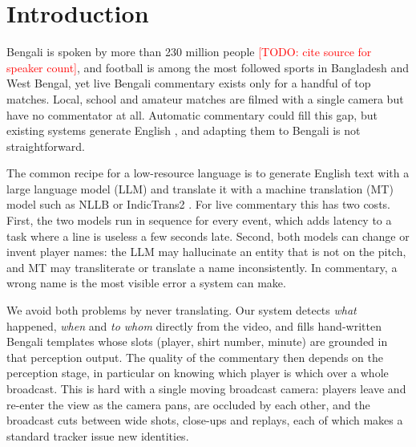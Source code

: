 \documentclass[conference]{IEEEtran}
\newcommand{\todo}[1]{\textcolor{red}{[TODO: #1]}}
\begin{document}
\section{Introduction}

Bengali is spoken by more than 230 million people \todo{cite source for speaker count}, and football is among the most followed sports in Bangladesh and West Bengal, yet live Bengali commentary exists only for a handful of top matches. Local, school and amateur matches are filmed with a single camera but have no commentator at all. Automatic commentary could fill this gap, but existing systems generate English \cite{mkhallati2023soccernetcaption,qi2023goal,rao2024matchtime}, and adapting them to Bengali is not straightforward.

The common recipe for a low-resource language is to generate English text with a large language model (LLM) and translate it with a machine translation (MT) model such as NLLB \cite{nllb2022} or IndicTrans2 \cite{gala2023indictrans2}. For live commentary this has two costs. First, the two models run in sequence for every event, which adds latency to a task where a line is useless a few seconds late. Second, both models can change or invent player names: the LLM may hallucinate an entity that is not on the pitch, and MT may transliterate or translate a name inconsistently. In commentary, a wrong name is the most visible error a system can make.

We avoid both problems by never translating. Our system detects \emph{what} happened, \emph{when} and \emph{to whom} directly from the video, and fills hand-written Bengali templates whose slots (player, shirt number, minute) are grounded in that perception output. The quality of the commentary then depends on the perception stage, in particular on knowing which player is which over a whole broadcast. This is hard with a single moving broadcast camera: players leave and re-enter the view as the camera pans, are occluded by each other, and the broadcast cuts between wide shots, close-ups and replays, each of which makes a standard tracker issue new identities.
\end{document}
